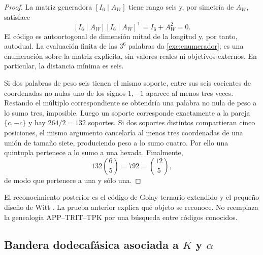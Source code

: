 \begin{proof}
La matriz generadora $[I_6\mid A_W]$ tiene rango seis y, por simetría
de $A_W$, satisface
\[
 [I_6\mid A_W][I_6\mid A_W]^{\mathsf T}
   =I_6+A_W^2=0.
\]
El código es autoortogonal de dimensión mitad de la longitud y, por
tanto, autodual. La evaluación finita de las $3^6$ palabras da
\eqref{exc:enumerador}; es una enumeración sobre la matriz explícita,
sin valores reales ni objetivos externos. En particular, la distancia
mínima es seis.

Si dos palabras de peso seis tienen el mismo soporte, entre sus seis
cocientes de coordenadas no nulas uno de los signos $1,-1$ aparece al
menos tres veces. Restando el múltiplo correspondiente se obtendría
una palabra no nula de peso a lo sumo tres, imposible. Luego un soporte
corresponde exactamente a la pareja $\{c,-c\}$ y hay $264/2=132$
soportes. Si dos soportes distintos compartieran cinco posiciones,
el mismo argumento cancelaría al menos tres coordenadas de una unión
de tamaño siete, produciendo peso a lo sumo cuatro. Por ello una
quintupla pertenece a lo sumo a una hexada. Finalmente,
\[
 132\binom65=792=\binom{12}5,
\]
de modo que pertenece a una y sólo una.
\end{proof}

El reconocimiento posterior es el código de Golay ternario extendido y
el pequeño diseño de Witt \cite{conwaysloane}. La prueba anterior explica qué objeto se
reconoce. No reemplaza la genealogía APP--TRIT--TPK por una búsqueda
entre códigos conocidos.

\subsection{Bandera dodecafásica asociada a \texorpdfstring{$K$ y $\alpha$}{K y alfa}}
\label{exc:bandera}



